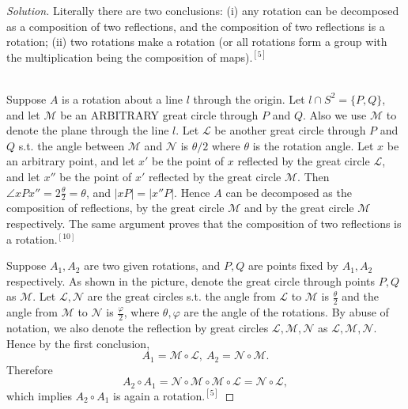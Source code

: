 \documentclass{article}
\theoremstyle{definition}
\theoremstyle{plain}
\begin{document}
\begin{adjustwidth}{0.7cm}{}
\color{blue}
\begin{proof}[Solution]Literally there are two conclusions: (i) any rotation can be decomposed as a composition of two reflections, and the composition of two reflections is a rotation; (ii) two rotations make a rotation (or all rotations form a group with the multiplication being the composition of maps)$.^{[5]}$\\~\par
Suppose $A$ is a rotation about a line $l$ through the origin. Let $l\cap S^2=\{P,Q\}$, and let $\mathscr{M}$ be an ARBITRARY great circle through $P$ and $Q$. Also we use $\mathscr{M}$ to denote the plane through the line $l$. Let $\mathscr{L}$ be another great circle through $P$ and $Q$ s.t. the angle between $\mathscr{M}$ and $\mathscr{N}$ is $\theta/2$ where $\theta$ is the rotation angle. Let $x$ be an arbitrary point, and let $x'$ be the point of $x$ reflected by the great circle $\mathscr{L}$, and let $x''$ be the point of $x'$ reflected by the great circle $\mathscr{M}$. Then $\angle xPx''=2\frac{\theta}{2}=\theta$, and $|xP|=|x''P|$. Hence $A$ can be decomposed as the composition of reflections, by the great circle $\mathscr{M}$ and by the great circle $\mathscr{M}$ respectively. The same argument proves that the composition of two reflections is a rotation$.^{[10]}$\par
Suppose $A_1,A_2$ are two given rotations, and $P,Q$ are points fixed by $A_1,A_2$ respectively. As shown in the picture, denote the great circle through points $P,Q$ as $\mathscr{M}$. Let $\mathscr{L},\mathscr{N}$ are the great circles s.t. the angle from $\mathscr{L}$ to $\mathscr{M}$ is $\frac{\theta}{2}$ and the angle from $\mathscr{M}$ to $\mathscr{N}$ is $\frac{\varphi}{2}$, where $\theta,\varphi$ are the angle of the rotations. By abuse of notation, we also denote the reflection by great circles $\mathscr{L},\mathscr{M},\mathscr{N}$ as $\mathscr{L},\mathscr{M},\mathscr{N}$. Hence by the first conclusion,
\begin{displaymath}
A_1=\mathscr{M}\circ\mathscr{L},~A_2=\mathscr{N}\circ\mathscr{M}.
\end{displaymath}
Therefore
\begin{displaymath}
A_2\circ A_1=\mathscr{N}\circ\mathscr{M}\circ\mathscr{M}\circ\mathscr{L}=\mathscr{N}\circ\mathscr{L},
\end{displaymath}
which implies $A_2\circ A_1$ is again a rotation$.^{[5]}$
\end{proof}
\color{black}
\end{adjustwidth}
~\par
\end{document}
